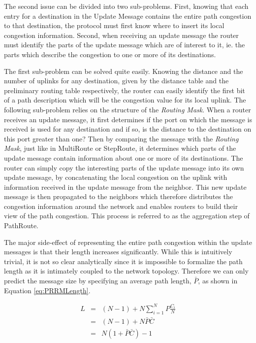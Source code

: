 
The second issue can be divided into two sub-problems. First, knowing that each
entry for a destination in the Update Message contains the entire path
congestion to that destination, the protocol must first know where to insert its
local congestion information. Second, when receiving an update message the
router must identify the parts of the update message which are of interest to
it, ie. the parts which describe the congestion to one or more of its
destinations.

The first sub-problem can be solved quite easily. Knowing the distance and the
number of uplinks for any destination, given by the distance table and the
preliminary routing table respectively, the router can easily identify the first
bit of a path description which will be the congestion value for its local
uplink.  The following sub-problem relies on the structure of the
\textit{Routing Mask}. When a router receives an update message, it first
determines if the port on which the message is received is used for any
destination and if so, is the distance to the destination on this port greater
than one? Then by comparing the message with the \textit{Routing Mask}, just
like in MultiRoute or StepRoute, it determines which parts of the update
message contain information about one or more of its destinations. The router
can simply copy the interesting parts of the update message into its own update
message, by concatenating the local congestion on the uplink with information
received in the update message from the neighbor. This new update message is
then propagated to the neighbors which therefore distributes the congestion
information around the network and enables routers to build their view of the
path congestion. This process is referred to as the aggregation step of
PathRoute. 

The major side-effect of representing the entire path congestion within the update messages is that their length increases significantly. While this is intuitively trivial, it is not so clear analytically since it is impossible to formalize the path length as it is intimately coupled to the network topology. Therefore  we can only predict the message size by specifying an average path length, $\bar{P}$, as shown in Equation \ref{eq:PRRMLength}.

\begin{eqnarray}
 L &=& (N-1) + N\displaystyle\sum\limits_{i=1}^{N} P\frac{C_{i}}{N} \\
&=& (N - 1) + N\bar{P}\bar{C} \\ 
&=& N(1 + \bar{P}\bar{C}) - 1
\label{eq:PRRMLength}
\end{eqnarray}

